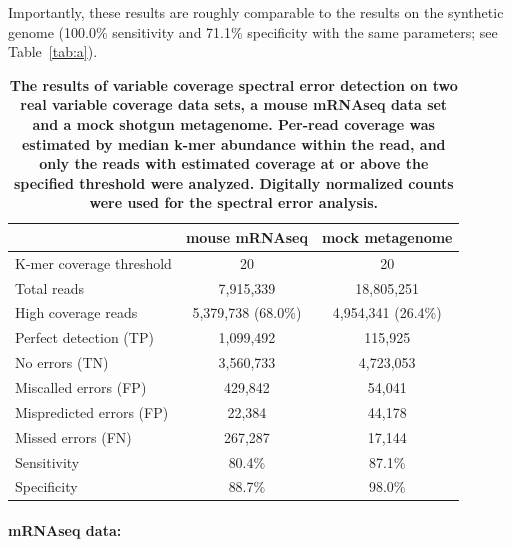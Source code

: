 \documentclass{article}
\begin{document}
Importantly, these results are roughly comparable to the results on the
synthetic genome (100.0\% sensitivity and 71.1\% specificity with the
same parameters; see Table~\ref{tab:a}).


\begin{table}
\begin{tabular}{|l|c||c|}
\hline
& {\bf mouse mRNAseq} & {\bf mock metagenome} \\
\hline
K-mer coverage threshold   & 20                 & 20              \\
Total reads                & 7,915,339          & 18,805,251       \\
High coverage reads        & 5,379,738 (68.0\%) & 4,954,341 (26.4\%) \\
\hline
Perfect detection (TP)     & 1,099,492          & 115,925          \\
No errors (TN)             & 3,560,733          & 4,723,053         \\
Miscalled errors (FP)      & 429,842            & 54,041           \\
Mispredicted errors (FP)   & 22,384             & 44,178          \\
Missed errors (FN)         & 267,287            & 17,144            \\
\hline
Sensitivity                & 80.4\%             & 87.1\%          \\
Specificity                & 88.7\%             & 98.0\%          \\
\hline
\end{tabular}

\caption{{\bf The results of variable coverage spectral error
    detection on two real variable coverage data sets, a mouse mRNAseq
    data set and a mock shotgun metagenome.  Per-read coverage was
    estimated by median k-mer abundance within the read, and only the
    reads with estimated coverage at or above the specified threshold
    were analyzed.  Digitally normalized counts were used for the
    spectral error analysis.}}
\label{tab:spectra_variable_real}

\end{table}

\paragraph{mRNAseq data:}

\end{document}
